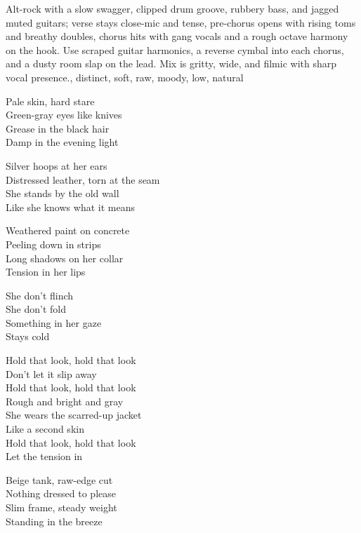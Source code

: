 
\begin{notes}
\end{notes}

\begin{style}
Alt-rock with a slow swagger, clipped drum groove, rubbery bass, and jagged muted guitars; verse stays close-mic and tense, pre-chorus opens with rising toms and breathy doubles, chorus hits with gang vocals and a rough octave harmony on the hook. %
Use scraped guitar harmonics, a reverse cymbal into each chorus, and a dusty room slap on the lead. %
Mix is gritty, wide, and filmic with sharp vocal presence., distinct, soft, raw, moody, low, natural
\end{style}

\begin{lyrics}
Pale skin, hard stare\\
Green-gray eyes like knives\\
Grease in the black hair\\
Damp in the evening light

Silver hoops at her ears\\
Distressed leather, torn at the seam\\
She stands by the old wall\\
Like she knows what it means

Weathered paint on concrete\\
Peeling down in strips\\
Long shadows on her collar\\
Tension in her lips

She don’t flinch\\
She don’t fold\\
Something in her gaze\\
Stays cold

Hold that look, hold that look\\
Don’t let it slip away\\
Hold that look, hold that look\\
Rough and bright and gray\\
She wears the scarred-up jacket\\
Like a second skin\\
Hold that look, hold that look\\
Let the tension in

Beige tank, raw-edge cut\\
Nothing dressed to please\\
Slim frame, steady weight\\
Standing in the breeze


\end{lyrics}
